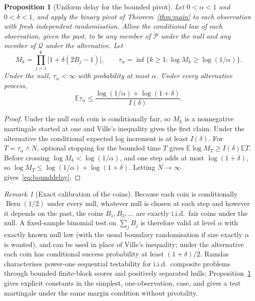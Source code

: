 \documentclass[11pt,a4paper]{article}
\newtheorem{proposition}[theorem]{Proposition}
\theoremstyle{definition}
\theoremstyle{remark}
\newtheorem{remark}[theorem]{Remark}
\newcommand{\PP}{\mathcal P}
\newcommand{\QQ}{\mathcal Q}
\newcommand{\EE}{\mathbb E}
\newcommand{\Bern}{\operatorname{Bern}}
\begin{document}
\begin{proposition}[Uniform delay for the bounded pivot]\label{prop:boundedseq}
Let \(0<\alpha<1\) and \(0<\delta<1\), and apply the binary pivot of Theorem~\ref{thm:main} to each observation with fresh independent randomisation. Allow the conditional law of each observation, given the past, to be any member of \(\PP\) under the null and any member of \(\QQ\) under the alternative. Let
\[
 M_k=\prod_{j=1}^k\bigl[1+\delta(2B_j-1)\bigr],\qquad \tau_\alpha=\inf\{k\ge1:\log M_k\ge\log(1/\alpha)\}.
\]
Under the null, \(\tau_\alpha<\infty\) with probability at most \(\alpha\). Under every alternative process,
\begin{equation}\label{eq:bounddelay}
 \EE\tau_\alpha\le\frac{\log(1/\alpha)+\log(1+\delta)}{I(\delta)} .
\end{equation}
\end{proposition}
\begin{proof}
Under the null each coin is conditionally fair, so \(M_k\) is a nonnegative martingale started at one and Ville's inequality gives the first claim. Under the alternative the conditional expected log increment is at least \(I(\delta)\). For \(T=\tau_\alpha\wedge N\), optional stopping for the bounded time \(T\) gives \(\EE\log M_T\ge I(\delta)\EE T\). Before crossing \(\log M_k<\log(1/\alpha)\), and one step adds at most \(\log(1+\delta)\), so \(\log M_T\le\log(1/\alpha)+\log(1+\delta)\). Letting \(N\to\infty\) gives~\eqref{eq:bounddelay}.
\end{proof}

\begin{remark}[Exact calibration of the coins]
Because each coin is conditionally \(\Bern(1/2)\) under every null, whatever null is chosen at each step and however it depends on the past, the coins \(B_1,B_2,\dots\) are exactly i.i.d.\ fair coins under the null. A fixed-sample binomial test on \(\sum_jB_j\) is therefore valid at level \(\alpha\) with exactly known null law (with the usual boundary randomisation if size exactly \(\alpha\) is wanted), and can be used in place of Ville's inequality; under the alternative each coin has conditional success probability at least \((1+\delta)/2\). Ramdas \cite{RamdasSeq} characterises power-one sequential testability for i.i.d.\ composite problems through bounded finite-block scores and positively separated hulls; Proposition~\ref{prop:boundedseq} gives explicit constants in the simplest, one-observation, case, and \cite[Corollary~7.1]{ZRW} gives a test martingale under the same margin condition without pivotality.
\end{remark}
\end{document}
